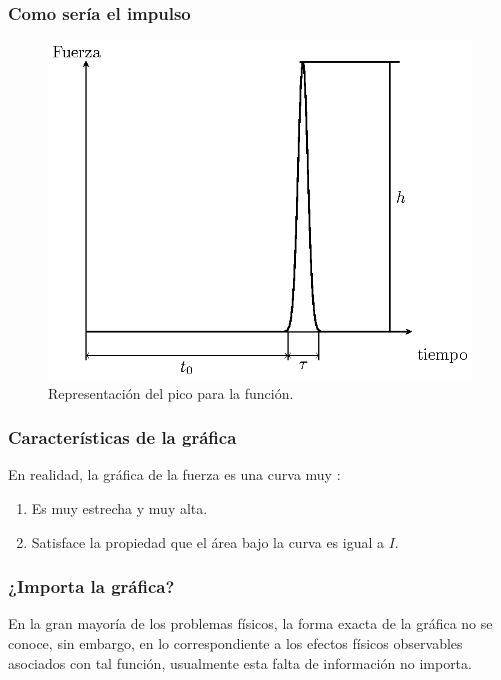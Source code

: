 \documentclass[12pt]{beamer}
\begin{document}
\begin{frame}
\frametitle{Como sería el impulso}
\begin{figure}[H]
    \centering
    \includegraphics[scale=0.8]{Imagenes/delta_Dirac_01.eps}
    \caption{Representación del pico para la función.}
    \label{fig:figura_delta_Dirac_01}
\end{figure}
\end{frame}
\begin{frame}
\frametitle{Características de la gráfica}
En realidad, la gráfica de la fuerza es una curva muy :
\begin{enumerate}[<+->]
\item Es muy estrecha y muy alta. %
\item Satisface la propiedad que el área bajo la curva es igual a $I$.
\end{enumerate}
\end{frame}
\begin{frame}
\frametitle{¿Importa la gráfica?}
En la gran mayoría de los problemas físicos, la forma exacta de la gráfica no se conoce, \pause sin embargo, en lo correspondiente a los efectos físicos observables asociados con tal función, usualmente esta falta de información no importa.
\end{frame}
\end{document}
